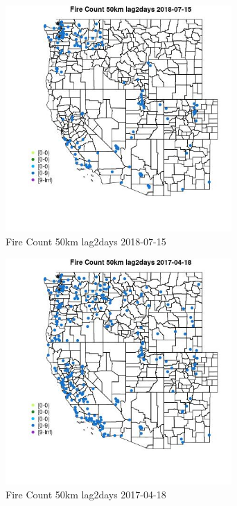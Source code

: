 \begin{figure} 
\centering  
\includegraphics[width=0.77\textwidth]{Code_Outputs/Report_ML_input_PM25_Step4_part_e_de_duplicated_aves_compiled_2019-05-21wNAs_MapObsFire_Count_50km_lag2days2018-07-15.jpg} 
\caption{\label{fig:Report_ML_input_PM25_Step4_part_e_de_duplicated_aves_compiled_2019-05-21wNAsMapObsFire_Count_50km_lag2days2018-07-15}Fire Count 50km lag2days 2018-07-15} 
\end{figure} 
 

\begin{figure} 
\centering  
\includegraphics[width=0.77\textwidth]{Code_Outputs/Report_ML_input_PM25_Step4_part_e_de_duplicated_aves_compiled_2019-05-21wNAs_MapObsFire_Count_50km_lag2days2017-04-18.jpg} 
\caption{\label{fig:Report_ML_input_PM25_Step4_part_e_de_duplicated_aves_compiled_2019-05-21wNAsMapObsFire_Count_50km_lag2days2017-04-18}Fire Count 50km lag2days 2017-04-18} 
\end{figure} 
 

